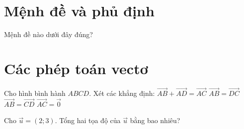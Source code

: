 \section*{Mệnh đề và phủ định}
\begin{ex}
Mệnh đề nào dưới đây đúng?
\end{ex}

\section*{Các phép toán vectơ}
\begin{ex}
Cho hình bình hành $ABCD$. Xét các khẳng định:
\choiceTF
{\True $\vec{AB}+\vec{AD}=\vec{AC}$}
{\True $\vec{AB}=\vec{DC}$}
{$\vec{AB}=\vec{CD}$}
{$\vec{AC}=\vec{0}$}
\end{ex}

\begin{ex}
Cho $\vec{u}=(2;3)$. Tổng hai tọa độ của $\vec{u}$ bằng bao nhiêu?
\end{ex}
